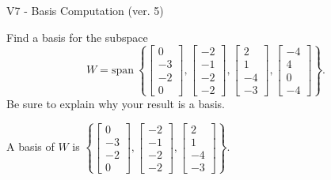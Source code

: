 \begin{exercise}
  \begin{exerciseTitle}V7 - Basis Computation (ver. 5)\end{exerciseTitle}
  \begin{exerciseStatement}
    Find a basis for the subspace 
\[W=\mathrm{span}\ \left\{\left[\begin{array}{r}
0 \\
-3 \\
-2 \\
0
\end{array}\right] , \left[\begin{array}{r}
-2 \\
-1 \\
-2 \\
-2
\end{array}\right] , \left[\begin{array}{r}
2 \\
1 \\
-4 \\
-3
\end{array}\right] , \left[\begin{array}{r}
-4 \\
4 \\
0 \\
-4
\end{array}\right]\right\}.\]
 Be sure to explain why your result is a basis.


  \end{exerciseStatement}
  \begin{exerciseAnswer}
   A basis of \(W\) is  \(\left\{\left[\begin{array}{r}
0 \\
-3 \\
-2 \\
0
\end{array}\right] , \left[\begin{array}{r}
-2 \\
-1 \\
-2 \\
-2
\end{array}\right] , \left[\begin{array}{r}
2 \\
1 \\
-4 \\
-3
\end{array}\right]\right\}\).
  


  \end{exerciseAnswer}
\end{exercise}